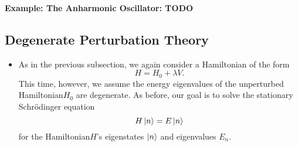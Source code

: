 \documentclass[11pt, a4paper]{article}
\newcommand{\Schro}{Schr\"{o}dinger\xspace}
\newcommand{\Ham}{Hamiltonian\xspace}
\begin{document}
\textbf{Example: The Anharmonic Oscillator: TODO}

\subsection{Degenerate Perturbation Theory}

\begin{itemize}
    \item As in the previous subsection, we again consider a \Ham of the form
    \begin{equation*}
        H = H_{0} + \lambda V.
    \end{equation*}
    This time, however, we assume the energy eigenvalues of the unperturbed \Ham $ H_{0} $ are degenerate. As before, our goal is to solve the stationary \Schro equation
    \begin{equation*}
        H \ket{n} = E \ket{n}
    \end{equation*}
    for the \Ham $ H $'s eigenstates $ \ket{n} $ and eigenvalues $ E_{n} $. 
\end{itemize}
\end{document}
